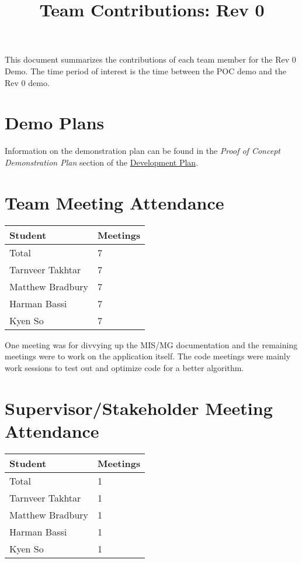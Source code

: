 \documentclass{article}
\title{Team Contributions: Rev 0\\\progname}
\author{\authname}
\date{}
\begin{document}
\maketitle

This document summarizes the contributions of each team member for the Rev 0
Demo.  The time period of interest is the time between the POC demo and the Rev
0 demo.

\section{Demo Plans}

Information on the demonstration plan can be found in the \textit{Proof of Concept Demonstration Plan} section of the \href{https://github.com/takhtart/PCD/blob/main/docs/DevelopmentPlan/DevelopmentPlan.pdf}{Development Plan}.

\section{Team Meeting Attendance}

\begin{table}[H]
\centering
\begin{tabular}{ll}
\toprule
\textbf{Student} & \textbf{Meetings}\\
\midrule
Total & 7\\
Tarnveer Takhtar & 7\\
Matthew Bradbury & 7\\
Harman Bassi & 7\\
Kyen So & 7\\
\bottomrule
\end{tabular}
\end{table}

One meeting was for divvying up the MIS/MG documentation and the remaining meetings were to work on the application itself.
The code meetings were mainly work sessions to test out and optimize code for a better algorithm. 

\section{Supervisor/Stakeholder Meeting Attendance}

\begin{table}[H]
\centering
\begin{tabular}{ll}
\toprule
\textbf{Student} & \textbf{Meetings}\\
\midrule
Total & 1\\
Tarnveer Takhtar & 1\\
Matthew Bradbury & 1\\
Harman Bassi & 1\\
Kyen So & 1\\
\bottomrule
\end{tabular}
\end{table}
\end{document}
